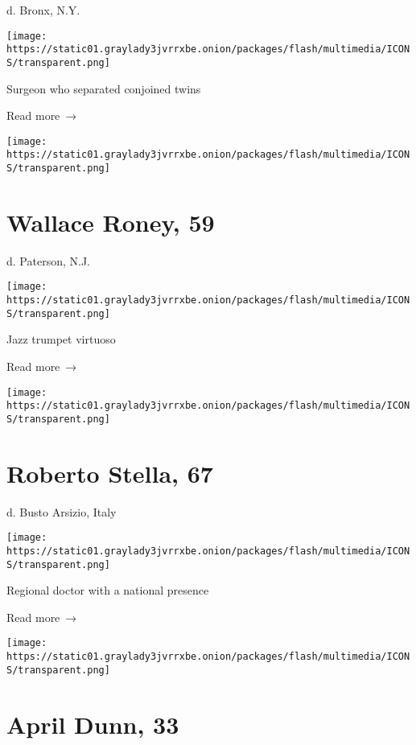d. Bronx, N.Y.

\texttt{[image: https://static01.graylady3jvrrxbe.onion/packages/flash/multimedia/ICONS/transparent.png]}

Surgeon who separated conjoined twins

 Read more~→

\href{https://www.nytimes3xbfgragh.onion/2020/03/31/arts/music/wallace-roney-dead-coronavirus.html}{}

\texttt{[image: https://static01.graylady3jvrrxbe.onion/packages/flash/multimedia/ICONS/transparent.png]}

\hypertarget{wallace-roney-59}{%
\section{Wallace Roney, 59}\label{wallace-roney-59}}

d. Paterson, N.J.

\texttt{[image: https://static01.graylady3jvrrxbe.onion/packages/flash/multimedia/ICONS/transparent.png]}

Jazz trumpet virtuoso

 Read more~→

\href{https://www.nytimes3xbfgragh.onion/2020/03/31/obituaries/roberto-stella-dead-coronavirus.html}{}

\texttt{[image: https://static01.graylady3jvrrxbe.onion/packages/flash/multimedia/ICONS/transparent.png]}

\hypertarget{roberto-stella-67}{%
\section{Roberto Stella, 67}\label{roberto-stella-67}}

d. Busto Arsizio, Italy

\texttt{[image: https://static01.graylady3jvrrxbe.onion/packages/flash/multimedia/ICONS/transparent.png]}

Regional doctor with a national presence

 Read more~→

\href{https://www.nytimes3xbfgragh.onion/2020/03/31/obituaries/april-dunn-dead-coronavirus.html}{}

\texttt{[image: https://static01.graylady3jvrrxbe.onion/packages/flash/multimedia/ICONS/transparent.png]}

\hypertarget{april-dunn-33}{%
\section{April Dunn, 33}\label{april-dunn-33}}

